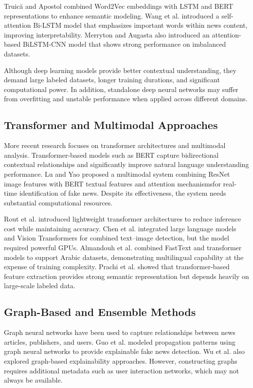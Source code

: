 \documentclass[conference]{IEEEtran}
\begin{document}
Truică and Apostol \cite{truica2023} combined Word2Vec embeddings with LSTM and BERT representations to enhance semantic modeling. Wang et al. \cite{wang2024} introduced a self-attention Bi-LSTM model that emphasizes important words within news content, improving interpretability. Merryton and Augasta \cite{merryton2024} also introduced an attention-based BiLSTM-CNN model that shows strong performance on imbalanced datasets.

Although deep learning models provide better contextual understanding, they demand large labeled datasets, longer training durations, and significant computational power. In addition, standalone deep neural networks may suffer from overfitting and unstable performance when applied across different domains.

\subsection{Transformer and Multimodal Approaches}
More recent research focuses on transformer architectures and multimodal analysis. Transformer-based models such as BERT capture bidirectional contextual relationships and significantly improve natural language understanding performance. Lu and Yao \cite{lu2025} proposed a multimodal system combining ResNet image features with BERT textual features and attention mechanismsfor real-time identification of fake news. Despite its effectiveness, the system needs substantial computational resources.

Rout et al. \cite{rout2025} introduced lightweight transformer architectures to reduce inference cost while maintaining accuracy. Chen et al. \cite{chen2025} integrated large language models and Vision Transformers for combined text–image detection, but the model required powerful GPUs. Almandouh et al. \cite{almandouh2024} combined FastText and transformer models to support Arabic datasets, demonstrating multilingual capability at the expense of training complexity. Prachi et al. \cite{prachi2022} showed that transformer-based feature extraction provides strong semantic representation but depends heavily on large-scale labeled data.

\subsection{Graph-Based and Ensemble Methods}
Graph neural networks have been used to capture relationships between news articles, publishers, and users. Guo et al. \cite{guo2023} modeled propagation patterns using graph neural networks to provide explainable fake news detection. Wu et al. \cite{wu2023} also explored graph-based explainability approaches. However, constructing graphs requires additional metadata such as user interaction networks, which may not always be available.
\end{document}
